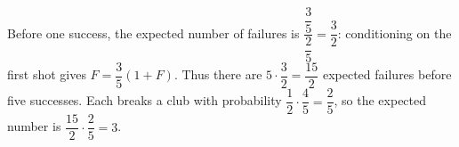 Before one success, the expected number of failures is $\dfrac{\dfrac{3}{5}}{\dfrac{2}{5}}=\dfrac{3}{2}$: conditioning on the first shot gives $F=\dfrac{3}{5}(1+F)$. Thus there are $5\cdot\dfrac{3}{2}=\dfrac{15}{2}$ expected failures before five successes. Each breaks a club with probability $\dfrac{1}{2}\cdot\dfrac{4}{5}=\dfrac{2}{5}$, so the expected number is $\dfrac{15}{2}\cdot\dfrac{2}{5}=\boxed3$.
